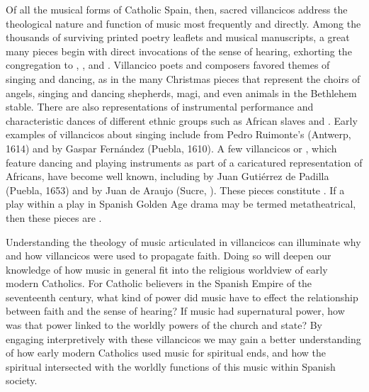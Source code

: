 Of all the musical forms of Catholic Spain, then, sacred villancicos address 
the theological nature and function of music most frequently and directly.
Among the thousands of surviving printed poetry leaflets and musical 
manuscripts, a great many pieces begin with direct invocations of the sense of 
hearing, exhorting the congregation to , 
, and .
Villancico poets and composers favored themes of singing and dancing, as in the 
many Christmas pieces that represent the choirs of angels, singing and dancing 
shepherds, magi, and even animals in the Bethlehem stable.
There are also representations of instrumental performance and characteristic 
dances of different ethnic groups such as African slaves and .
Early examples of villancicos about singing include  
from Pedro Ruimonte's  (Antwerp, 1614) and 
 by Gaspar Fernández (Puebla, 1610).%
  \autocites[296--309]{Ruimonte:Parnaso}[240--244]{Fernandez:Cancionero}
A few  villancicos or , which feature dancing 
and playing instruments as part of a caricatured representation of Africans, 
have become well known, including  by Juan 
Gutiérrez de Padilla (Puebla, 1653) and  by 
Juan de Araujo (Sucre, ).%
  \autocites{Padilla:Tello}
    [Araujo ed. Robert Stevenson (1985) in][I:~655--668]{Burkholder:Anthology}
These pieces constitute .
If a play within a play in Spanish Golden Age drama may be termed 
metatheatrical, then these pieces are . %

Understanding the theology of music articulated in villancicos can illuminate 
why and how villancicos were used to propagate faith.
Doing so will deepen our knowledge of how music in general fit into the 
religious worldview of early modern Catholics.
For Catholic believers in the Spanish Empire of the seventeenth century, what 
kind of power did music have to effect the relationship between faith and the 
sense of hearing?
If music had supernatural power, how was that power linked to the worldly 
powers of the church and state? 
By engaging interpretively with these villancicos we may gain a better 
understanding of how early modern Catholics used music for spiritual ends, and 
how the spiritual intersected with the worldly functions of this music within 
Spanish society.

